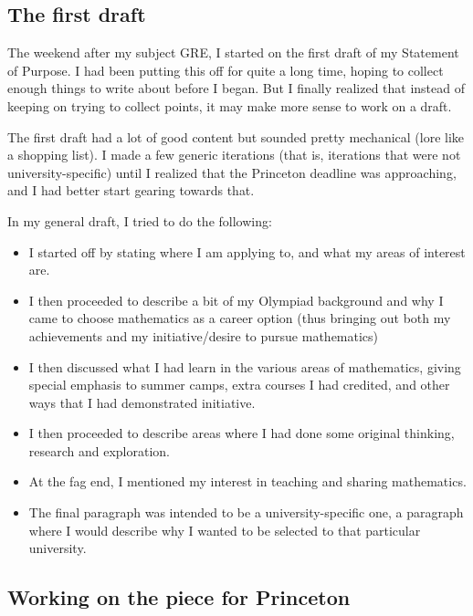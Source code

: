 \documentclass[a4paper]{amsart}
\begin{document}
\subsection{The first draft}

The weekend after my subject GRE, I started on the first draft of my
Statement of Purpose. I had been putting this off for quite a long time,
hoping to collect enough things to write about before I began.
But I finally realized that instead of keeping on trying
to collect points, it may make more sense to work on a draft.

The first draft had a lot of good content but sounded pretty
mechanical (lore like a shopping list). I made a few generic
iterations (that is, iterations that were not university-specific) until
I realized that the Princeton deadline was approaching, and I had better
start gearing towards that.

In my general draft, I tried to do the following:

\begin{itemize}

\item I started off by stating where I am applying to, and what
  my areas of interest are.

\item I then proceeded to describe a bit of my Olympiad background and
  why I came to choose mathematics as a career option (thus bringing
  out both my achievements and my initiative/desire to pursue mathematics)

\item I then discussed what I had learn in the various areas of mathematics,
  giving special emphasis to summer camps, extra courses I had credited,
  and other ways that I had demonstrated initiative.

\item I then proceeded to describe areas where I had done some
  original thinking, research and exploration.

\item At the fag end, I mentioned my interest in teaching and sharing
  mathematics.

\item The final paragraph was intended to be a university-specific one,
  a paragraph where I would describe why I wanted to be selected
  to that particular university.

\end{itemize}

\subsection{Working on the piece for Princeton}
\end{document}
